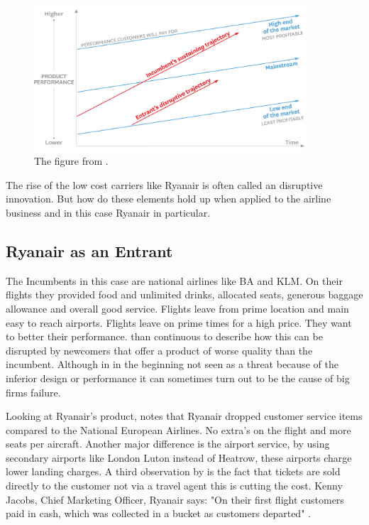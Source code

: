\documentclass[a4paper, 11pt]{article}
\begin{document}
\begin{figure}[h!]
    \centering
    \includegraphics[width=0.9\textwidth]{big-model.png}
    \caption{The figure from \cite{Christensen2015}.}
    \label{fig:graph1}
\end{figure}

The rise of the low cost carriers like Ryanair is often called an disruptive innovation.
But how do these elements hold up when applied to the airline business and in this case Ryanair in particular.


\subsection{Ryanair as an Entrant}


The Incumbents in this case are national airlines like BA and KLM. On their flights they provided food and unlimited drinks, allocated seats, generous baggage allowance and overall good service. Flights leave from prime location and main easy to reach airports. Flights leave on prime times for a high price. They want to better their performance. \cite{Christensen97} than continuous to describe how this can be disrupted by newcomers that offer a product of worse quality than the incumbent. Although in in the beginning not seen as a threat because of the inferior design or performance it can sometimes turn out to be the cause of big firms failure.

Looking at Ryanair's product, \cite{Barrett} notes that Ryanair dropped customer service items compared to the National European Airlines. No extra's on the flight and more seats per aircraft. Another major difference is the airport service, by using secondary airports like London Luton instead of Heatrow, these airports charge lower landing charges. A third observation by \cite{Barrett} is the fact that tickets are sold directly to the customer not via a travel agent this is cutting the cost. Kenny Jacobs, Chief Marketing Officer, Ryanair says: "On their first flight customers paid in cash, which was collected in a bucket as customers departed" \citep{ITBberlin}.
\end{document}
